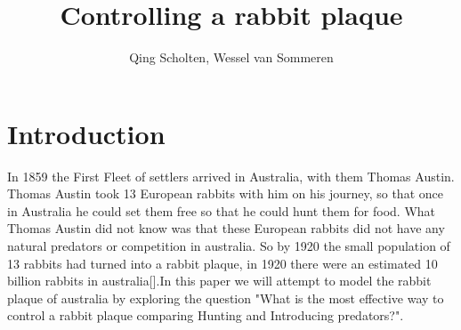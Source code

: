 \documentclass{article}
\author{Qing Scholten, Wessel van Sommeren}
\title{Controlling a rabbit plaque}
\begin{document}
\maketitle
\newpage
\tableofcontents
\newpage

\section{Introduction}
In 1859 the First Fleet of settlers arrived in Australia, with them Thomas Austin. Thomas Austin took 13 European rabbits with him on his journey, so that once in Australia he could set them free so that he could hunt them for food. What Thomas Austin did not know was that these European rabbits did not have any natural predators or competition in australia. So by 1920 the small population of 13 rabbits had turned into a rabbit plaque, in 1920 there were an estimated 10 billion rabbits in australia[\cite{RabbitsAus}].In this paper we will attempt to model the rabbit plaque of australia by exploring the question "What is the most effective way to control a rabbit plaque comparing Hunting and Introducing predators?".
\end{document}
